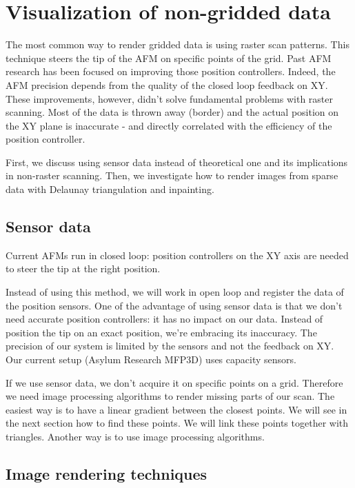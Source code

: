 \chapter{Visualization of non-gridded data}

The most common way to render gridded data is using raster scan patterns. This technique steers the tip of the AFM on specific points of the grid. Past AFM research has been focused on improving those position controllers. Indeed, the AFM precision depends from the quality of the closed loop feedback on XY. These improvements, however, didn't solve fundamental problems with raster scanning. Most of the data is thrown away (border) and the actual position on the XY plane is inaccurate - and directly correlated with the efficiency of the position controller.

First, we discuss using sensor data instead of theoretical one and its implications in non-raster scanning. Then, we investigate how to render images from sparse data with Delaunay triangulation and inpainting. 

\section{Sensor data}
 
Current AFMs run in closed loop: position controllers on the XY axis are needed to steer the tip at the right position. 

Instead of using this method, we will work in open loop and register the data of the position sensors. One of the advantage of using sensor data is that we don't need accurate position controllers: it has no impact on our data. Instead of position the tip on an exact position, we're embracing its inaccuracy. The precision of our system is limited by the sensors and not the feedback on XY. Our current setup (Asylum Research MFP3D) uses capacity sensors.

If we use sensor data, we don't acquire it on specific points on a grid. Therefore we need image processing algorithms to render missing parts of our scan.  The easiest way is to have a linear gradient between the closest points. We will see in the next section how to find these points. We will link these points together with triangles. Another way is to use image processing algorithms.


\section{Image rendering techniques}

